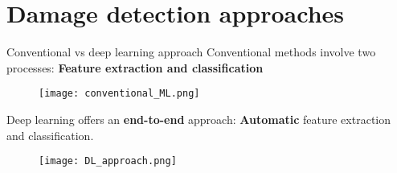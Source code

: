 \documentclass[10pt,aspectratio=169,dvipsnames]{beamer} %
\begin{document}
	\section{Damage detection approaches}
	\begin{frame}{Conventional vs deep learning approach}
		Conventional methods involve two processes:
		\alert{\textbf{Feature extraction and classification}}
		\begin{figure}
			\centering
			\texttt{[image: conventional\_ML.png]}
		\end{figure}	
	
		Deep learning offers an \alert{\textbf{end-to-end}} approach: \alert{\textbf{Automatic}} feature extraction and classification.
		\begin{figure}
			\texttt{[image: DL\_approach.png]}
		\end{figure}
	\end{frame}
\end{document}
